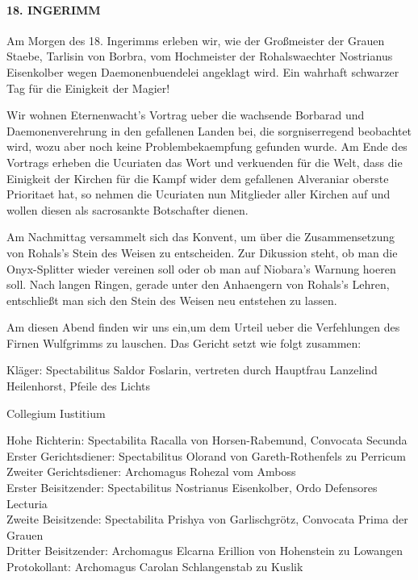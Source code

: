 \paragraph{18. INGERIMM}
Am Morgen des 18. Ingerimms erleben wir, wie der Großmeister der Grauen Staebe, Tarlisin von Borbra, vom Hochmeister der Rohalswaechter Nostrianus Eisenkolber wegen Daemonenbuendelei angeklagt wird. Ein wahrhaft schwarzer Tag für die Einigkeit der Magier!

Wir wohnen Eternenwacht's Vortrag ueber die wachsende Borbarad und Daemonenverehrung in den gefallenen Landen bei, die sorgniserregend beobachtet wird, wozu aber noch keine Problembekaempfung gefunden wurde.
Am Ende des Vortrags erheben die Ucuriaten das Wort und verkuenden für die Welt, dass die Einigkeit der Kirchen für die Kampf wider dem gefallenen Alveraniar oberste Prioritaet hat, so nehmen die Ucuriaten nun Mitglieder aller Kirchen auf und wollen diesen als sacrosankte Botschafter dienen.

Am Nachmittag versammelt sich das Konvent, um über die Zusammensetzung von Rohals's Stein des Weisen zu entscheiden. Zur Dikussion steht, ob man die Onyx-Splitter wieder vereinen soll oder ob man auf Niobara's Warnung hoeren soll. Nach langen Ringen, gerade unter den Anhaengern von Rohals's Lehren, entschließt man sich den Stein des Weisen neu entstehen zu lassen.

Am diesen Abend finden wir uns ein,um dem Urteil ueber die Verfehlungen des Firnen Wulfgrimms zu lauschen.
Das Gericht setzt wie folgt zusammen:

Kläger: Spectabilitus Saldor Foslarin, vertreten durch Hauptfrau Lanzelind Heilenhorst, Pfeile des Lichts

Collegium Iustitium

Hohe Richterin: Spectabilita Racalla von Horsen-Rabemund, Convocata Secunda\\
Erster Gerichtsdiener: Spectabilitus Olorand von Gareth-Rothenfels zu Perricum\\
Zweiter Gerichtsdiener: Archomagus Rohezal vom Amboss\\
Erster Beisitzender: Spectabilitus Nostrianus Eisenkolber, Ordo Defensores Lecturia\\
Zweite Beisitzende: Spectabilita Prishya von Garlischgrötz, Convocata Prima der Grauen\\
Dritter Beisitzender: Archomagus Elcarna Erillion von Hohenstein zu Lowangen\\
Protokollant: Archomagus Carolan Schlangenstab zu Kuslik

